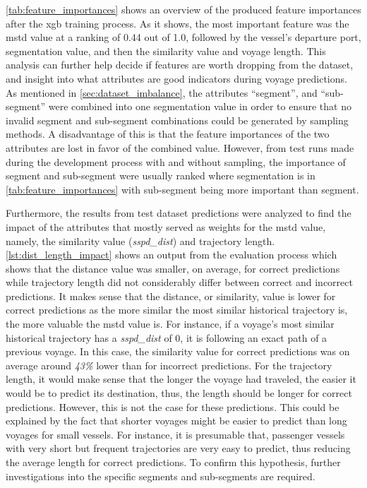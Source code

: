 \cref{tab:feature_importances} shows an overview of the produced feature importances after the \acrshort{xgb} training process. As it shows, the most important feature was the \acrshort{mstd} value at a ranking of 0.44 out of 1.0, followed by the vessel's departure port, segmentation value, and then the similarity value and voyage length. This analysis can further help decide if features are worth dropping from the dataset, and insight into what attributes are good indicators during voyage predictions. As mentioned in \cref{sec:dataset_imbalance}, the attributes ``segment'', and ``sub-segment'' were combined into one segmentation value in order to ensure that no invalid segment and sub-segment combinations could be generated by sampling methods. A disadvantage of this is that the feature importances of the two attributes are lost in favor of the combined value. However, from test runs made during the development process with and without sampling, the importance of segment and sub-segment were usually ranked where segmentation is in \cref{tab:feature_importances} with sub-segment being more important than segment.

Furthermore, the results from test dataset predictions were analyzed to find the impact of the attributes that mostly served as weights for the \acrshort{mstd} value, namely, the similarity value (\textit{sspd\_dist}) and trajectory length. \cref{lst:dist_length_impact} shows an output from the evaluation process which shows that the distance value was smaller, on average, for correct predictions while trajectory length did not considerably differ between correct and incorrect predictions. It makes sense that the distance, or similarity, value is lower for correct predictions as the more similar the most similar historical trajectory is, the more valuable the \acrshort{mstd} value is. For instance, if a voyage's most similar historical trajectory has a \textit{sspd\_dist} of 0, it is following an exact path of a previous voyage. In this case, the similarity value for correct predictions was on average around \textit{43\%} lower than for incorrect predictions. For the trajectory length, it would make sense that the longer the voyage had traveled, the easier it would be to predict its destination, thus, the length should be longer for correct predictions. However, this is not the case for these predictions. This could be explained by the fact that shorter voyages might be easier to predict than long voyages for small vessels. For instance, it is presumable that, passenger vessels with very short but frequent trajectories are very easy to predict, thus reducing the average length for correct predictions. To confirm this hypothesis, further investigations into the specific segments and sub-segments are required.

